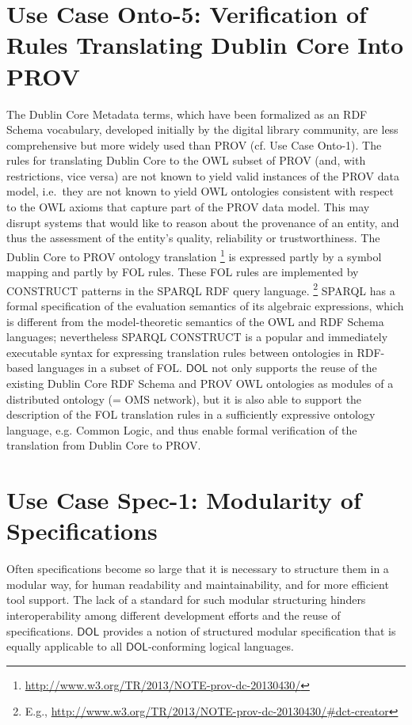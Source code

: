 \documentclass[10pt,fleqn,final]{scrreprt}
\newcommand*{\DOL}{\ensuremath{\mathsf{DOL}}\xspace}
\newenvironment{definitions}[0]{\medskip }{}
\begin{document}
\begin{definitions}
\section{Use Case Onto-5: Verification of Rules Translating Dublin Core Into PROV}
The Dublin Core Metadata terms, which have been formalized as an RDF Schema vocabulary, developed initially by the digital library community, are less 
comprehensive but more widely used than PROV (cf. Use Case Onto-1). The rules for translating Dublin Core to the OWL subset of PROV (and, with restrictions, 
vice versa) are not known to yield valid instances of the PROV data model, i.e.\ they are not known to yield OWL ontologies consistent with respect to the OWL axioms that 
capture part of the PROV data model. This may disrupt systems that would like to reason about the provenance of an entity, and thus the assessment of the 
entity's quality, reliability or trustworthiness.
The Dublin Core to PROV ontology translation%
\footnote{\url{http://www.w3.org/TR/2013/NOTE-prov-dc-20130430/}}
  is expressed partly by a symbol mapping and partly by FOL rules. These FOL rules are implemented by CONSTRUCT patterns in the SPARQL RDF query language.%
\footnote{E.g., \url{http://www.w3.org/TR/2013/NOTE-prov-dc-20130430/\#dct-creator}} 
SPARQL has a formal specification of the evaluation semantics of its algebraic expressions, which is different from the model-theoretic semantics of the OWL and RDF Schema languages; nevertheless SPARQL CONSTRUCT is a popular and immediately executable syntax for expressing translation rules between ontologies in RDF-based languages in a subset of FOL.
\DOL  not only supports the reuse of the existing Dublin Core RDF Schema and PROV OWL ontologies as modules of a distributed ontology (= OMS network), but it is also able to support the description of the FOL translation rules in a sufficiently expressive ontology language, e.g. Common Logic, and thus enable formal verification of the translation from Dublin Core to PROV.


\section{Use Case Spec-1: Modularity of Specifications}\label{spec-1}
Often specifications become so large that it is necessary to structure
them in a modular way, for human readability and maintainability, and for more efficient tool support. The lack of a standard for such
modular structuring hinders interoperability among different
development efforts and the reuse of specifications.  \DOL provides a
notion of structured modular specification that is equally applicable
to all \DOL-conforming logical languages.


\end{definitions}
\end{document}
